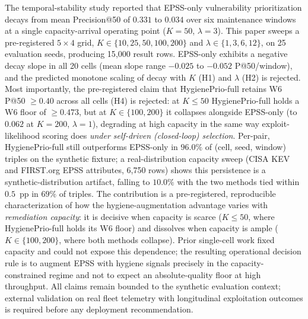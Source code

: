 The temporal-stability study reported that EPSS-only vulnerability prioritization decays
from mean Precision@50 of $0.331$ to $0.034$ over six maintenance
windows at a single capacity-arrival operating point ($K = 50$,
$\lambda = 3$). This paper sweeps a pre-registered $5 \times 4$ grid,
$K \in \{10, 25, 50, 100, 200\}$ and $\lambda \in \{1, 3, 6, 12\}$,
on 25 evaluation seeds, producing 15{,}000 result rows. EPSS-only
exhibits a negative decay slope in all 20 cells (mean slope range
$-0.025$ to $-0.052$ P@50/window), and the predicted monotone scaling
of decay with $K$ (H1) and $\lambda$ (H2) is rejected. Most
importantly, the pre-registered claim that HygienePrio-full retains
W6 P@50 $\geq 0.40$ across all cells (H4) is rejected: at
$K \leq 50$ HygienePrio-full holds a W6 floor of $\geq 0.473$, but at
$K \in \{100, 200\}$ it collapses alongside EPSS-only (to $0.062$ at
$K = 200$, $\lambda = 1$), degrading at high capacity in the same way
exploit-likelihood scoring does \emph{under self-driven (closed-loop)
selection}. Per-pair, HygienePrio-full still outperforms EPSS-only in
$96.0\%$ of (cell, seed, window) triples on the synthetic fixture; a
real-distribution capacity sweep (CISA KEV and FIRST.org EPSS
attributes, 6{,}750 rows) shows this persistence is a
synthetic-distribution artifact, falling to $10.0\%$ with the two
methods tied within $0.5$~pp in $69\%$ of triples. The contribution
is a pre-registered, reproducible characterization of how the
hygiene-augmentation advantage varies with \emph{remediation
capacity}: it is decisive when capacity is scarce ($K \leq 50$, where
HygienePrio-full holds its W6 floor) and dissolves when capacity is
ample ($K \in \{100, 200\}$, where both methods collapse). Prior
single-cell work fixed capacity and could not expose this dependence;
the resulting operational decision rule is to augment EPSS with hygiene
signals precisely in the capacity-constrained regime and not to expect
an absolute-quality floor at high throughput. All claims remain
bounded to the synthetic evaluation context; external validation on
real fleet telemetry with longitudinal exploitation outcomes is
required before any deployment recommendation.
